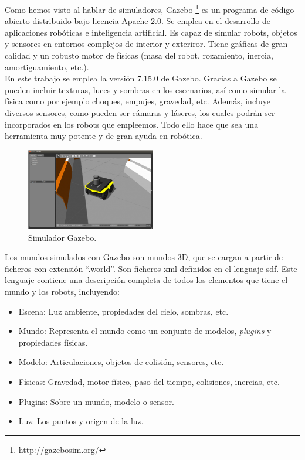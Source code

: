 Como hemos visto al hablar de simuladores, Gazebo \footnote{\url{http://gazebosim.org/}} es un programa de código abierto distribuido bajo licencia Apache 2.0. Se emplea en el desarrollo de aplicaciones robóticas e inteligencia artificial. Es capaz de simular robots, objetos y sensores en entornos complejos de interior y exteriror. Tiene gráficas de gran calidad y un robusto motor de físicas (masa del robot, rozamiento, inercia, amortiguamiento, etc.).\\

En este trabajo se emplea la versión 7.15.0 de Gazebo. Gracias a Gazebo se pueden incluir texturas, luces y sombras en los escenarios, así como simular la física como por ejemplo choques, empujes, gravedad, etc. Además, incluye diversos sensores, como pueden ser cámaras y láseres, los cuales podrán ser incorporados en los robots que empleemos. Todo ello hace que sea una herramienta muy potente y de gran ayuda en robótica.\\

\begin{figure}
\begin{center}
	\includegraphics[width=0.5\textwidth]{figures/Estado_arte/gazebo2.png}
   \caption{Simulador Gazebo.}
	\label{fig.gazebo1  }
\end{center}
\end{figure}

Los mundos simulados con Gazebo son mundos 3D, que se cargan a partir de ficheros con extensión ``.world''. Son ficheros \acrfull{xml} definidos en el lenguaje \acrfull{sdf}. Este lenguaje contiene una descripción completa de todos los elementos que tiene el mundo y los robots, incluyendo:


\begin{itemize}
\item Escena: Luz ambiente, propiedades del cielo, sombras, etc.
\item Mundo: Representa el mundo como un conjunto de modelos, \textit{plugins} y propiedades físicas.
\item Modelo: Articulaciones, objetos de colisión, sensores, etc.
\item Físicas: Gravedad, motor físico, paso del tiempo, colisiones, inercias, etc.
\item Plugins: Sobre un mundo, modelo o sensor.
\item Luz: Los puntos y origen de la luz.
\end{itemize}

